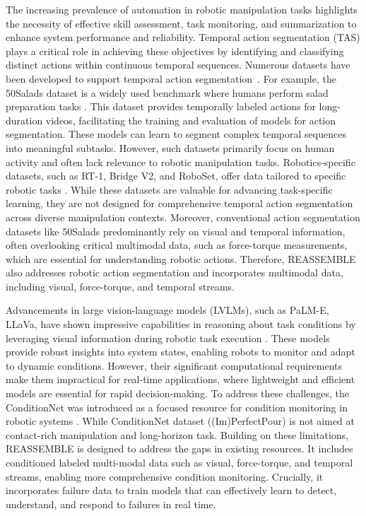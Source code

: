 The increasing prevalence of automation in robotic manipulation tasks highlights the necessity of effective skill assessment, task monitoring, and summarization to enhance system performance and reliability. Temporal action segmentation (TAS) plays a critical role in achieving these objectives by identifying and classifying distinct actions within continuous temporal sequences. Numerous datasets have been developed to support temporal action segmentation~\cite{50Salads,GTEA,breakfast}. For example, the 50Salads dataset is a widely used benchmark where humans perform salad preparation tasks \cite{50Salads}. This dataset provides temporally labeled actions for long-duration videos, facilitating the training and evaluation of models for action segmentation. These models can learn to segment complex temporal sequences into meaningful subtasks. However, such datasets primarily focus on human activity and often lack relevance to robotic manipulation tasks. Robotics-specific datasets, such as RT-1, Bridge V2, and RoboSet, offer data tailored to specific robotic tasks \cite{brohan2022rt,walke2023bridgedata}. While these datasets are valuable for advancing task-specific learning, they are not designed for comprehensive temporal action segmentation across diverse manipulation contexts. Moreover, conventional action segmentation datasets like 50Salads predominantly rely on visual and temporal information, often overlooking critical multimodal data, such as force-torque measurements, which are essential for understanding robotic actions. Therefore, REASSEMBLE also addresses robotic action segmentation and incorporates multimodal data, including visual, force-torque, and temporal streams. 

Advancements in large vision-language models (LVLMs), such as PaLM-E, LLaVa, have shown impressive capabilities in reasoning about task conditions by leveraging visual information during robotic task execution \cite{driess2023palm,li2023m}. These models provide robust insights into system states, enabling robots to monitor and adapt to dynamic conditions. However, their significant computational requirements make them impractical for real-time applications, where lightweight and efficient models are essential for rapid decision-making. To address these challenges, the ConditionNet was introduced as a focused resource for condition monitoring in robotic systems \cite{sliwowski2024conditionnet}. While ConditionNet dataset ((Im)PerfectPour) is not aimed at contact-rich manipulation and long-horizon task. Building on these limitations, REASSEMBLE is designed to address the gaps in existing resources. It includes conditioned labeled multi-modal data such as visual, force-torque, and temporal streams, enabling more comprehensive condition monitoring. Crucially, it incorporates failure data to train models that can effectively learn to detect, understand, and respond to failures in real time. 

